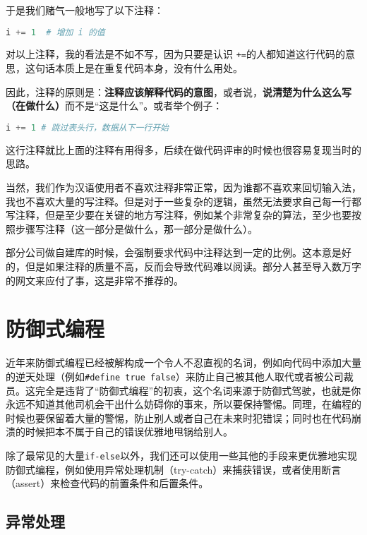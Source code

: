 于是我们赌气一般地写了以下注释：
\begin{lstlisting}[language=Python]
    i += 1  # 增加 i 的值
\end{lstlisting}

对以上注释，我的看法是不如不写，因为只要是认识 \texttt{+=}的人都知道这行代码的意思，这句话本质上是在重复代码本身，没有什么用处。

因此，注释的原则是：\textbf{注释应该解释代码的意图}，或者说，\textbf{说清楚为什么这么写（在做什么）}而不是“这是什么”。或者举个例子：

\begin{lstlisting}[language=Python]
    i += 1 # 跳过表头行，数据从下一行开始
\end{lstlisting}

这行注释就比上面的注释有用得多，后续在做代码评审的时候也很容易复现当时的思路。

当然，我们作为汉语使用者不喜欢注释非常正常，因为谁都不喜欢来回切输入法，我也不喜欢大量的写注释。但是对于一些复杂的逻辑，虽然无法要求自己每一行都写注释，但是至少要在关键的地方写注释，例如某个非常复杂的算法，至少也要按照步骤写注释（这一部分是做什么，那一部分是做什么）。

\begin{note}
  部分公司做自建库的时候，会强制要求代码中注释达到一定的比例。这本意是好的，但是如果注释的质量不高，反而会导致代码难以阅读。部分人甚至导入数万字的网文来应付了事，这是非常不推荐的。
\end{note}

\section{防御式编程}

近年来防御式编程已经被解构成一个令人不忍直视的名词，例如向代码中添加大量的逆天处理（例如\texttt{\#define true false}）来防止自己被其他人取代或者被公司裁员。这完全是违背了“防御式编程”的初衷，这个名词来源于防御式驾驶，也就是你永远不知道其他司机会干出什么妨碍你的事来，所以要保持警惕。同理，在编程的时候也要保留着大量的警惕，防止别人或者自己在未来时犯错误；同时也在代码崩溃的时候把本不属于自己的错误优雅地甩锅给别人。

除了最常见的大量\texttt{if-else}以外，我们还可以使用一些其他的手段来更优雅地实现防御式编程，例如使用异常处理机制（try-catch）来捕获错误，或者使用断言（assert）来检查代码的前置条件和后置条件。

\subsection{异常处理}

